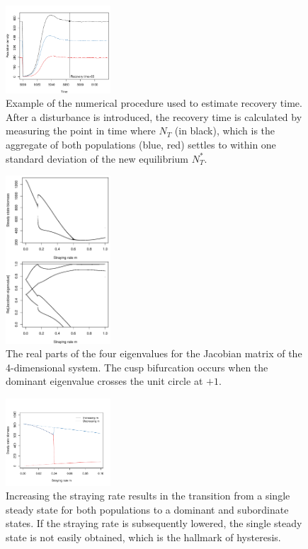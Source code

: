 \documentclass{revtex4}
\begin{document}
\begin{figure}
  \captionsetup{justification=raggedright,
singlelinecheck=false
}
\centering
\includegraphics[width=0.35\textwidth]{fig_recovery.pdf}
\caption{
Example of the numerical procedure used to estimate recovery time. After a disturbance is introduced, the recovery time is calculated by measuring the point in time where $N_T$ (in black), which is the aggregate of both populations (blue, red) settles to within one standard deviation of the new equilibrium $N_T^*$. 
} \label{fig:recovery}
\end{figure}


\begin{figure}
  \captionsetup{justification=raggedright,
singlelinecheck=false
}
\centering
\includegraphics[width=0.35\textwidth]{fig_eigs.pdf}
\caption{
The real parts of the four eigenvalues for the Jacobian matrix of the 4-dimensional system.
The cusp bifurcation occurs when the dominant eigenvalue crosses the unit circle at $+1$. 
} \label{fig:eigs}
\end{figure}


\begin{figure}
  \captionsetup{justification=raggedright,
singlelinecheck=false
}
\centering
\includegraphics[width=0.35\textwidth]{fig_hysteresis.pdf}
\caption{
Increasing the straying rate results in the transition from a single steady state for both populations to a dominant and subordinate states. If the straying rate is subsequently lowered, the single steady state is not easily obtained, which is the hallmark of hysteresis.
} \label{fig:hysteresis}
\end{figure}
\end{document}
